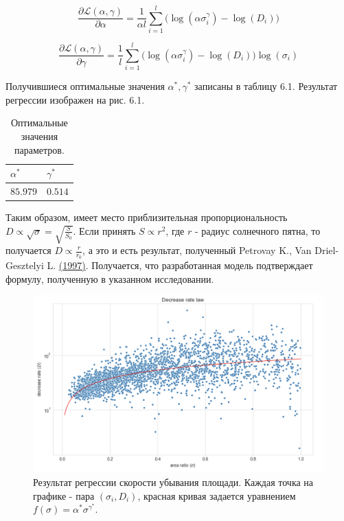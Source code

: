 \documentclass[a4paper, 12pt]{article}
\newcommand{\bibref}[3]{#2 \hyperlink{#1}{\color{blue}(#3)}}
\begin{document}
\begin{equation}
    \frac{\partial \mathcal{L}(\alpha, \gamma) }{\partial \alpha} = \frac{1}{\alpha l} \sum_{i=1}^l \Big(\log(\alpha \sigma_i^{\gamma}) - \log(D_i) \Big)
\end{equation}

\begin{equation}
    \frac{\partial \mathcal{L}(\alpha, \gamma) }{\partial \gamma} = \frac{1}{l} \sum_{i=1}^l \Big(\log(\alpha \sigma_i^{\gamma}) - \log(D_i) \Big) \log(\sigma_i)
\end{equation}

Получившиеся оптимальные значения $\alpha^*, \gamma^*$ записаны в таблицу 6.1. Результат регрессии изображен на рис. 6.1.

\begin{table}[H]
\centering

\begin{tabular}{|M{2.2cm}|M{2.2cm}|}
\hline
$\alpha^*$ & $\gamma^*$ \\
\hline
$85.979$ & $0.514$ \\
\hline
\end{tabular}

\caption{\label{tab:table-name} Оптимальные значения параметров.}
\end{table}

Таким образом, имеет место приблизительная пропорциональность $D \propto \sqrt{\sigma} = \sqrt{\frac{S}{S_0}}$. Если принять $S \propto r^2$, где $r$ - радиус солнечного пятна, то получается $D \propto \frac{r}{r_0}$, а это и есть результат, полученный \bibref{petrovay}{Petrovay K., Van Driel-Gesztelyi L.}{1997}. Получается, что разработанная модель подтверждает формулу, полученную в указанном исследовании.

\begin{figure}[H]
    \centering
    \includegraphics[width=17cm]{decrease_rate.png}
    \caption{Результат регрессии скорости убывания площади. Каждая точка на графике - пара $(\sigma_i, D_i)$, красная кривая задается уравнением $f(\sigma) = \alpha^* \sigma^{\gamma^*}$.}
    \label{fig:my_label}
\end{figure}
\end{document}
